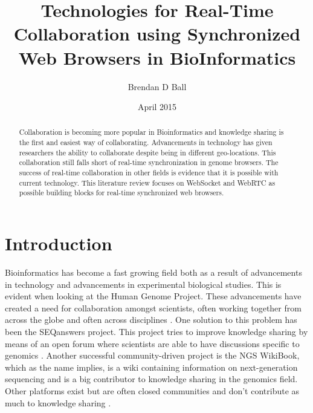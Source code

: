 \documentclass[prodmode,acmtecs]{acmsmall}
\begin{document}

\title{Technologies for Real-Time Collaboration using Synchronized Web Browsers in BioInformatics} %
\author{Brendan D Ball
}
\date{April 2015}

\begin{abstract}
Collaboration is becoming more popular in Bioinformatics and knowledge sharing is the first and easiest way of collaborating. Advancements in technology has given researchers the ability to collaborate despite being in different geo-locations. This collaboration still falls short of real-time synchronization in genome browsers. The success of real-time collaboration in other fields is evidence that it is possible with current technology. This literature review focuses on WebSocket and WebRTC as possible building blocks for real-time synchronized web browsers.
\end{abstract}

\maketitle
\section{Introduction}

Bioinformatics has become a fast growing field both as a result of advancements in technology and advancements in experimental biological studies. This is evident when looking at the Human Genome Project. These advancements have created a need for collaboration amongst scientists, often working together from across the globe and often across disciplines \cite{li2013ngs,lee2007facilitating,tsiliki2014datamining}. One solution to this problem has been the SEQanswers project. This project tries to improve knowledge sharing by means of an open forum where scientists are able to have discussions specific to genomics \cite{li2012seqanswers}. Another successful community-driven project is the NGS WikiBook, which as the name implies, is a wiki containing information on next-generation sequencing and is a big contributor to knowledge sharing in the genomics field. Other platforms exist but are often closed communities and don't contribute as much to knowledge sharing \cite{li2013ngs}.\\
\end{document}
